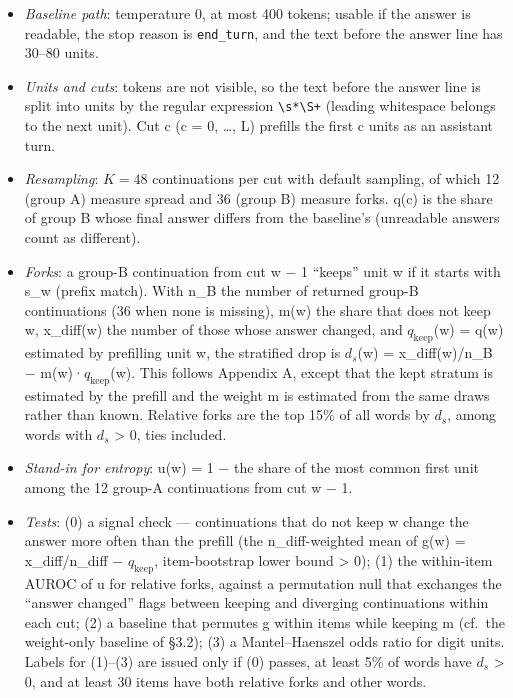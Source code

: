 \documentclass[
  10pt,
  a4paper,
]{article}
\providecommand{\tightlist}{%
  \setlength{\itemsep}{0pt}\setlength{\parskip}{0pt}}
\begin{document}
\begin{itemize}
\tightlist
\item
  \emph{Baseline path}: temperature 0, at most 400 tokens; usable if the answer is readable, the stop reason is \texttt{end\_\allowbreak{}turn}, and the text before the answer line has 30--80 units.
\item
  \emph{Units and cuts}: tokens are not visible, so the text before the answer line is split into units by the regular expression \texttt{\textbackslash{}s*\textbackslash{}S+} (leading whitespace
  belongs to the next unit). Cut c (c = 0, \ldots, L) prefills the first c units as an assistant turn.
\item
  \emph{Resampling}: \(K = 48\) continuations per cut with default sampling, of which 12 (group A) measure spread and 36 (group B) measure forks. q(c) is the share of group B whose final answer
  differs from the baseline's (unreadable answers count as different).
\item
  \emph{Forks}: a group-B continuation from cut w − 1 ``keeps'' unit w if it starts with s\_w (prefix match). With n\_B the number of returned group-B continuations (36 when none is missing), m(w) the
  share that does not keep w, x\_diff(w) the number of those whose answer changed, and \(q_{\mathrm{keep}}\)(w) = q(w) estimated by prefilling unit w, the stratified drop is \(d_{s}\)(w) =
  x\_diff(w)/n\_B − m(w)·\(q_{\mathrm{keep}}\)(w). This follows Appendix A, except that the kept stratum is estimated by the prefill and the weight m is estimated from the same draws rather than
  known. Relative forks are the top 15\% of all words by \(d_{s}\), among words with \(d_{s}\) \textgreater{} 0, ties included.
\item
  \emph{Stand-in for entropy}: u(w) = 1 − the share of the most common first unit among the 12 group-A continuations from cut w − 1.
\item
  \emph{Tests}: (0) a signal check --- continuations that do not keep w change the answer more often than the prefill (the n\_diff-weighted mean of g(w) = x\_diff/n\_diff − \(q_{\mathrm{keep}}\),
  item-bootstrap lower bound \textgreater{} 0); (1) the within-item AUROC of u for relative forks, against a permutation null that exchanges the ``answer changed'' flags between keeping and diverging
  continuations within each cut; (2) a baseline that permutes g within items while keeping m (cf.~the weight-only baseline of §3.2); (3) a Mantel--Haenszel odds ratio for digit units. Labels for
  (1)--(3) are issued only if (0) passes, at least 5\% of words have \(d_{s}\) \textgreater{} 0, and at least 30 items have both relative forks and other words.
\end{itemize}
\end{document}

